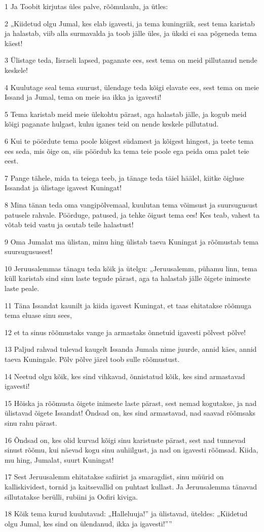 \par 1 Ja Toobit kirjutas üles palve, rõõmulaulu, ja ütles:
\par 2 „Kiidetud olgu Jumal, kes elab igavesti, ja tema kuningriik, sest tema karistab ja halastab, viib alla surmavalda ja toob jälle üles, ja ükski ei saa põgeneda tema käest!
\par 3 Ülistage teda, Iisraeli lapsed, paganate ees, sest tema on meid pillutanud nende keskele!
\par 4 Kuulutage seal tema suurust, ülendage teda kõigi elavate ees, sest tema on meie Issand ja Jumal, tema on meie isa ikka ja igavesti!
\par 5 Tema karistab meid meie ülekohtu pärast, aga halastab jälle, ja kogub meid kõigi paganate hulgast, kuhu iganes teid on nende keskele pillutatud.
\par 6 Kui te pöördute tema poole kõigest südamest ja kõigest hingest, ja teete tema ees seda, mis õige on, siis pöördub ka tema teie poole ega peida oma palet teie eest.
\par 7 Pange tähele, mida ta teiega teeb, ja tänage teda täiel häälel, kiitke õigluse Issandat ja ülistage igavest Kuningat!
\par 8 Mina tänan teda oma vangipõlvemaal, kuulutan tema võimsust ja suursugusust patusele rahvale. Pöörduge, patused, ja tehke õigust tema ees! Kes teab, vahest ta võtab teid vastu ja osutab teile halastust!
\par 9 Oma Jumalat ma ülistan, minu hing ülistab taeva Kuningat ja rõõmustab tema suursugususest!
\par 10 Jeruusalemmas tänagu teda kõik ja ütelgu: „Jeruusalemm, pühamu linn, tema küll karistab sind sinu laste tegude pärast, aga ta halastab jälle õigete inimeste laste peale.
\par 11 Täna Issandat kaunilt ja kiida igavest Kuningat, et taas ehitatakse rõõmuga tema eluase sinu sees,
\par 12 et ta sinus rõõmustaks vange ja armastaks õnnetuid igavesti põlvest põlve!
\par 13 Paljud rahvad tulevad kaugelt Issanda Jumala nime juurde, annid käes, annid taeva Kuningale. Põlv põlve järel toob sulle rõõmustust.
\par 14 Neetud olgu kõik, kes sind vihkavad, õnnistatud kõik, kes sind armastavad igavesti!
\par 15 Hõiska ja rõõmusta õigete inimeste laste pärast, sest nemad kogutakse, ja nad ülistavad õigete Issandat! Õndsad on, kes sind armastavad, nad saavad rõõmsaks sinu rahu pärast.
\par 16 Õndsad on, kes olid kurvad kõigi sinu karistuste pärast, sest nad tunnevad sinust rõõmu, kui näevad kogu sinu auhiilgust, ja nad on igavesti rõõmsad. Kiida, mu hing, Jumalat, suurt Kuningat!
\par 17 Sest Jeruusalemm ehitatakse safiirist ja smaragdist, sinu müürid on kalliskividest, tornid ja kaitsevallid on puhtast kullast. Ja Jeruusalemma tänavad sillutatakse berülli, rubiini ja Oofiri kiviga.
\par 18 Kõik tema kurud kuulutavad: „Halleluuja!” ja ülistavad, üteldes: „Kiidetud olgu Jumal, kes sind on ülendanud, ikka ja igavesti!””

